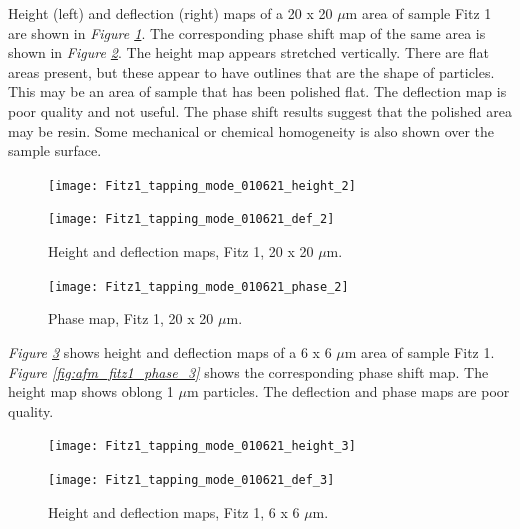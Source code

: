 Height (left) and deflection (right) maps of a 20 x 20 $\mu$m area of sample Fitz 1 are shown in \textit{Figure \ref{fig:afm_fitz1_height_def_2}}. The corresponding phase shift map of the same area is shown in \textit{Figure \ref{fig:afm_fitz1_phase_2}}. The height map appears stretched vertically. There are flat areas present, but these appear to have outlines that are the shape of particles. This may be an area of sample that has been polished flat. The deflection map is poor quality and not useful. The phase shift results suggest that the polished area may be resin. Some mechanical or chemical homogeneity is also shown over the sample surface.

\begin{figure}[H]
\centering
\begin{minipage}{.45\textwidth}
  \centering
  \texttt{[image: Fitz1\_tapping\_mode\_010621\_height\_2]}
\end{minipage}
\begin{minipage}{.45\textwidth}
  \centering
  \texttt{[image: Fitz1\_tapping\_mode\_010621\_def\_2]}
\end{minipage}
\caption[Height and deflection maps, Fitz 1]{Height and deflection maps, Fitz 1, 20 x 20 $\mu$m.}
\label{fig:afm_fitz1_height_def_2}
\end{figure}

\begin{figure}[H]
\centering
  \texttt{[image: Fitz1\_tapping\_mode\_010621\_phase\_2]}
\caption[Phase map, Fitz 1]{Phase map, Fitz 1, 20 x 20 $\mu$m.}
\label{fig:afm_fitz1_phase_2}
\end{figure}

\textit{Figure \ref{fig:afm_fitz1_height_def_3}} shows height and deflection maps of a 6 x 6 $\mu$m area of sample Fitz 1. \textit{Figure \ref{fig:afm_fitz1_phase_3}} shows the corresponding phase shift map. The height map shows oblong 1 $\mu$m particles. The deflection and phase maps are poor quality.

\begin{figure}[H]
\centering
\begin{minipage}{.45\textwidth}
  \centering
  \texttt{[image: Fitz1\_tapping\_mode\_010621\_height\_3]}
\end{minipage}
\begin{minipage}{.45\textwidth}
  \centering
  \texttt{[image: Fitz1\_tapping\_mode\_010621\_def\_3]}
\end{minipage}
\caption[Height and deflection maps, Fitz 1]{Height and deflection maps, Fitz 1, 6 x 6 $\mu$m.}
\label{fig:afm_fitz1_height_def_3}
\end{figure}

